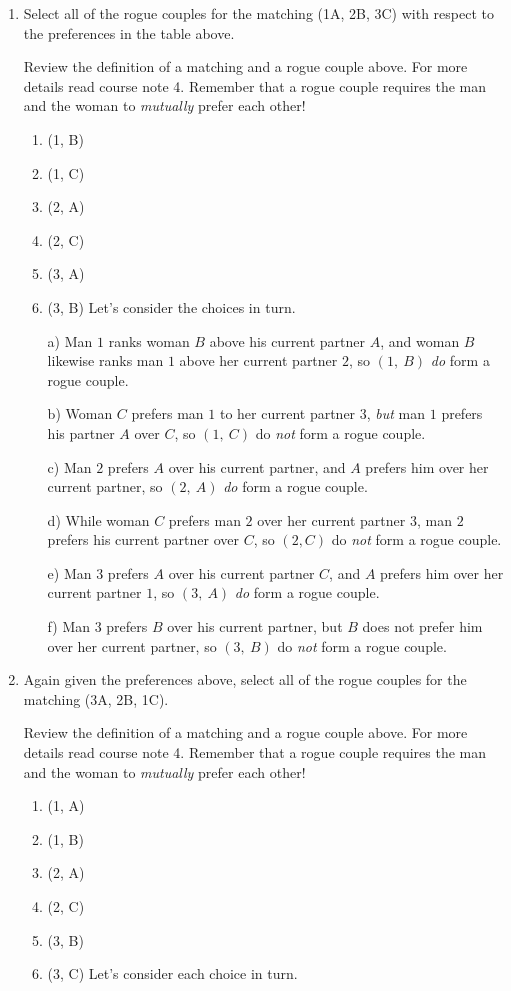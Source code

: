\documentclass[11pt, preview]{standalone} %
\begin{document}
\begin{enumerate}
\item Select all of the rogue couples for the matching (1A, 2B, 3C) with respect to the preferences in the table above.
\begin{Multi}
\Hint Review the definition of a matching and a rogue couple above. For more details read course note 4. Remember that a rogue couple requires the man and the woman to {\it mutually} prefer each other!
\begin{enumerate}
\TrueChoice\item (1, B)
\FalseChoice\item (1, C)
\TrueChoice\item (2, A)
\FalseChoice\item (2, C)
\TrueChoice\item (3, A)
\FalseChoice\item (3, B)
\Solution Let's consider the choices in turn. 

a) Man $1$ ranks woman $B$ above his current partner $A$, and woman $B$ likewise ranks man $1$ above her current partner $2$, so $(1,\ B)$ {\it do} form a rogue couple.

b) Woman $C$ prefers man $1$ to her current partner $3$, {\it but} man $1$ prefers his partner $A$ over $C$, so $(1,\ C)$ do {\it not} form a rogue couple.

c) Man $2$ prefers $A$ over his current partner, and $A$ prefers him over her current partner, so $(2,\ A)$ {\it do} form a rogue couple.

d) While woman $C$ prefers man $2$ over her current partner $3$, man $2$ prefers his current partner over $C$, so $(2, C)$ do {\it not} form a rogue couple.

e) Man $3$ prefers $A$ over his current partner $C$, and $A$ prefers him over her current partner $1$, so $(3,\ A)$ {\it do} form a rogue couple.

f) Man $3$ prefers $B$ over his current partner, but $B$ does not prefer him over her current partner, so $(3,\ B)$ do {\it not} form a rogue couple.
\end{enumerate}
\end{Multi}
\item Again given the preferences above, select all of the rogue couples for the matching (3A, 2B, 1C).
\begin{Multi}
\Hint Review the definition of a matching and a rogue couple above. For more details read course note 4. Remember that a rogue couple requires the man and the woman to {\it mutually} prefer each other!
\begin{enumerate}
\FalseChoice\item (1, A)
\TrueChoice\item (1, B)
\FalseChoice\item (2, A)
\FalseChoice\item (2, C)
\FalseChoice\item (3, B)
\FalseChoice\item (3, C)
\Solution Let's consider each choice in turn.


\end{enumerate}
\end{Multi}
\end{enumerate}
\end{document}
